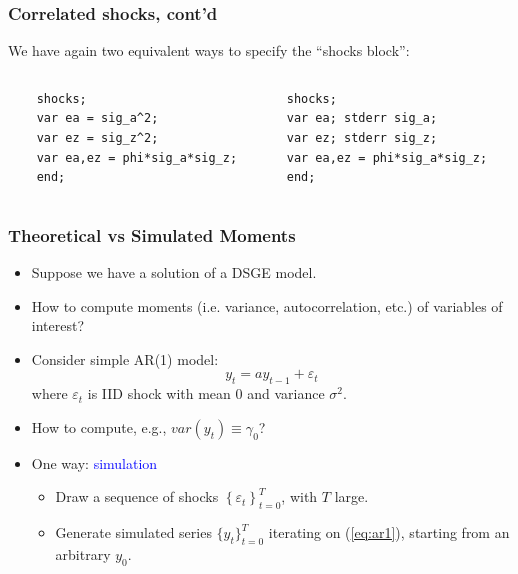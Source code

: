 \documentclass{beamer}
\newcommand{\eps}{\varepsilon}
\begin{document}
\begin{frame}[fragile]
\frametitle{Correlated shocks, cont'd}

We have again two equivalent ways to specify the ``shocks block'':

\small 
\begin{columns}[c]
	
	\begin{verbatim}
	shocks;
	var ea = sig_a^2;
	var ez = sig_z^2;
	var ea,ez = phi*sig_a*sig_z;
	end;
	\end{verbatim}
	
	\begin{verbatim}
	shocks;
	var ea; stderr sig_a;
	var ez; stderr sig_z;
	var ea,ez = phi*sig_a*sig_z;
	end;
	\end{verbatim}
	
\end{columns}

\end{frame}

\begin{frame}
\frametitle{Theoretical vs Simulated Moments}
\small 
\begin{itemize}
	\item Suppose we have a solution of a DSGE model.
	\item How to compute moments (i.e. variance, autocorrelation, etc.) of variables of interest?
	\pause 
	\item Consider simple AR(1) model:
	\begin{equation}\label{eq:ar1}
	y_{t} = ay_{t-1}+\eps_{t}
	\end{equation}
	where $ \eps_{t} $ is IID shock with mean 0 and variance $ \sigma^{2} $.
	\item How to compute, e.g., $ var(y_{t}) \equiv \gamma_{0} $?
	\item One way: \textcolor{blue}{simulation}
	\begin{itemize}
		\item Draw a sequence of shocks $ \left\lbrace \eps_{t} \right\rbrace_{t=0}^{T}  $, with $ T $ large.
		\item Generate simulated series $ \{y_{t} \}_{t=0}^{T} $ iterating on (\ref{eq:ar1}), starting from an arbitrary $ y_{0} $.
	\end{itemize}
\end{itemize}
\end{frame}
\end{document}
